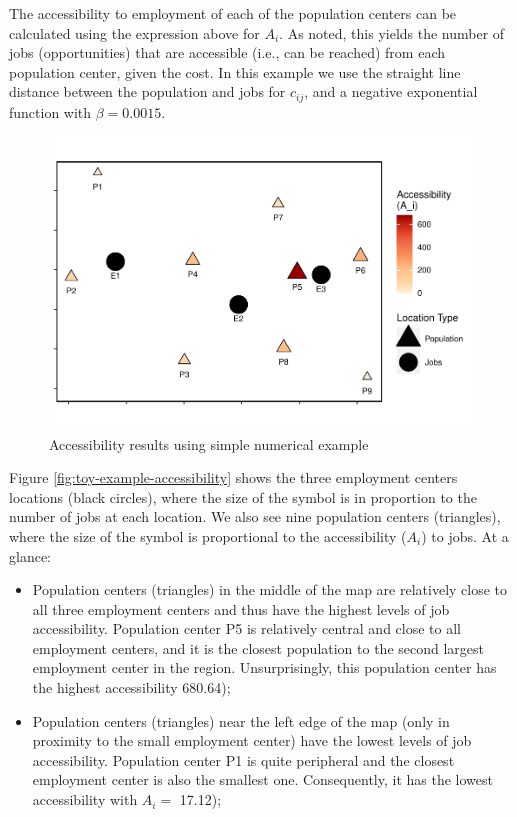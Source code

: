 \documentclass[]{elsarticle} %
\begin{document}
The accessibility to employment of each of the population centers can be
calculated using the expression above for \(A_i\). As noted, this yields
the number of jobs (opportunities) that are accessible (i.e., can be
reached) from each population center, given the cost. In this example we
use the straight line distance between the population and jobs for
\(c_{ij}\), and a negative exponential function with \(\beta = 0.0015\).

\begin{figure}
\includegraphics[width=1\linewidth]{Spatial-Availability_files/figure-latex/toy-example-accessibility-plot-1} \caption{\label{fig:toy-example-accessibility}Accessibility results using simple numerical example}\label{fig:toy-example-accessibility-plot}
\end{figure}

Figure \ref{fig:toy-example-accessibility} shows the three employment
centers locations (black circles), where the size of the symbol is in
proportion to the number of jobs at each location. We also see nine
population centers (triangles), where the size of the symbol is
proportional to the accessibility (\(A_i\)) to jobs. At a glance:

\begin{itemize}
\item
  Population centers (triangles) in the middle of the map are relatively
  close to all three employment centers and thus have the highest levels
  of job accessibility. Population center P5 is relatively central and
  close to all employment centers, and it is the closest population to
  the second largest employment center in the region. Unsurprisingly,
  this population center has the highest accessibility 680.64);
\item
  Population centers (triangles) near the left edge of the map (only in
  proximity to the small employment center) have the lowest levels of
  job accessibility. Population center P1 is quite peripheral and the
  closest employment center is also the smallest one. Consequently, it
  has the lowest accessibility with \(A_i=\) 17.12);
\end{itemize}
\end{document}
